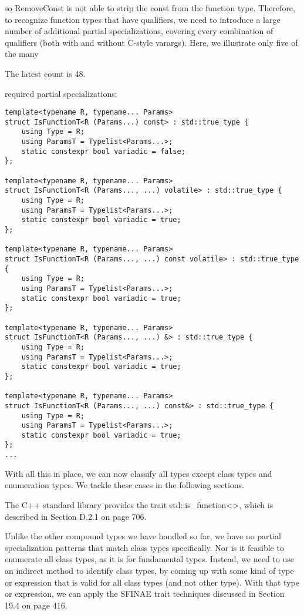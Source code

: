 so RemoveConst is not able to strip the const from the function type. Therefore, to recognize function types that have qualifiers, we need to introduce a large number of additional partial specializations, covering every combination of qualifiers (both with and without C-style varargs). Here, we illustrate only five of the many

\begin{tcolorbox}[colback=webgreen!5!white,colframe=webgreen!75!black]
\hspace*{0.75cm}The latest count is 48.
\end{tcolorbox}

required partial specializations:

\begin{lstlisting}[style=styleCXX]
template<typename R, typename... Params>
struct IsFunctionT<R (Params...) const> : std::true_type {
	using Type = R;
	using ParamsT = Typelist<Params...>;
	static constexpr bool variadic = false;
};

template<typename R, typename... Params>
struct IsFunctionT<R (Params..., ...) volatile> : std::true_type {
	using Type = R;
	using ParamsT = Typelist<Params...>;
	static constexpr bool variadic = true;
};

template<typename R, typename... Params>
struct IsFunctionT<R (Params..., ...) const volatile> : std::true_type {
	using Type = R;
	using ParamsT = Typelist<Params...>;
	static constexpr bool variadic = true;
};

template<typename R, typename... Params>
struct IsFunctionT<R (Params..., ...) &> : std::true_type {
	using Type = R;
	using ParamsT = Typelist<Params...>;
	static constexpr bool variadic = true;
};

template<typename R, typename... Params>
struct IsFunctionT<R (Params..., ...) const&> : std::true_type {
	using Type = R;
	using ParamsT = Typelist<Params...>;
	static constexpr bool variadic = true;
};
...
\end{lstlisting}

With all this in place, we can now classify all types except class types and enumeration types. We tackle these cases in the following sections.

The C++ standard library provides the trait std::is\_function<>, which is described in Section D.2.1 on page 706.


Unlike the other compound types we have handled so far, we have no partial specialization patterns that match class types specifically. Nor is it feasible to enumerate all class types, as it is for fundamental types. Instead, we need to use an indirect method to identify class types, by coming up with some kind of type or expression that is valid for all class types (and not other type). With that type or expression, we can apply the SFINAE trait techniques discussed in Section 19.4 on page 416.

